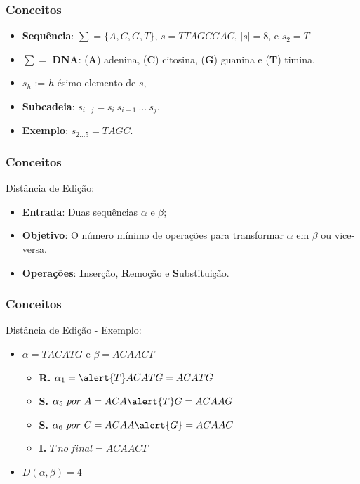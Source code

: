 \documentclass[10pt, compress]{beamer}
\begin{document}
\begin{frame}[fragile]
	\frametitle{Conceitos}
    \begin{itemize}
    	\item \textbf{Sequência}: $\sum = \{A, C, G, T\}$, $s = TTAGCGAC$,  $|s| = 8$, e $s_2 = T$
		\item $\sum = $ \textbf{DNA}: (\textbf{A}) adenina, (\textbf{C}) citosina, (\textbf{G}) guanina e (\textbf{T}) timina.
        
        \vspace{0.5cm} \pause
        
        \item $s_h$ := $h$-ésimo elemento de $s$, 
        
        \item \textbf{Subcadeia}: $s_{i \ldots j} = s_i \ s_{i+1} \ \ldots \ s_j$.
		\item \textbf{Exemplo}: $s_{2 \ldots 5} = TAGC$.
    \end{itemize}
\end{frame}

\begin{frame}[fragile]
	\frametitle{Conceitos}
	Distância de Edição:
    \begin{itemize}
    	\item \textbf{Entrada}: Duas sequências $\alpha$ e $\beta$;
        \item \textbf{Objetivo}: O número mínimo de operações para transformar $\alpha$ em $\beta$ ou vice-versa.
        \item \textbf{Operações}: \textbf{I}nserção, \textbf{R}emoção e \textbf{S}ubstituição.
    \end{itemize}
\end{frame}

\begin{frame}[fragile]
	\frametitle{Conceitos}
	Distância de Edição - Exemplo:
    \begin{itemize}
    	\item $\alpha = TACATG$ e $\beta = ACAACT$
        \begin{itemize}
        	\item \textbf{R.} $\alpha_1 = \alert{T}ACATG = ACATG$
            \item \textbf{S.} $\alpha_5 \ por \ A = ACA\alert{T}G = ACAAG$
            \item \textbf{S.} $\alpha_6 \ por \ C = ACAA\alert{G} = ACAAC$
            \item \textbf{I.} $T \ no \ final = ACAACT$
        \end{itemize}
        \item $D(\alpha,\beta) = 4$
    \end{itemize}
\end{frame}
\end{document}
